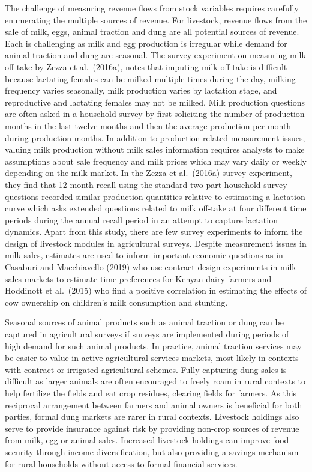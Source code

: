 \documentclass[
]{book}
\begin{document}
The challenge of measuring revenue flows from stock variables requires carefully enumerating the multiple sources of revenue. For livestock, revenue flows from the sale of milk, eggs, animal traction and dung are all potential sources of revenue. Each is challenging as milk and egg production is irregular while demand for animal traction and dung are seasonal. The survey experiment on measuring milk off-take by Zezza et al.~(2016a), notes that imputing milk off-take is difficult because lactating females can be milked multiple times during the day, milking frequency varies seasonally, milk production varies by lactation stage, and reproductive and lactating females may not be milked. Milk production questions are often asked in a household survey by first soliciting the number of production months in the last twelve months and then the average production per month during production months. In addition to production-related measurement issues, valuing milk production without milk sales information requires analysts to make assumptions about sale frequency and milk prices which may vary daily or weekly depending on the milk market. In the Zezza et al.~(2016a) survey experiment, they find that 12-month recall using the standard two-part household survey questions recorded similar production quantities relative to estimating a lactation curve which asks extended questions related to milk off-take at four different time periods during the annual recall period in an attempt to capture lactation dynamics. Apart from this study, there are few survey experiments to inform the design of livestock modules in agricultural surveys. Despite measurement issues in milk sales, estimates are used to inform important economic questions as in Casaburi and Macchiavello (2019) who use contract design experiments in milk sales markets to estimate time preferences for Kenyan dairy farmers and Hoddinott et al.~(2015) who find a positive correlation in estimating the effects of cow ownership on children's milk consumption and stunting.

Seasonal sources of animal products such as animal traction or dung can be captured in agricultural surveys if surveys are implemented during periods of high demand for such animal products. In practice, animal traction services may be easier to value in active agricultural services markets, most likely in contexts with contract or irrigated agricultural schemes. Fully capturing dung sales is difficult as larger animals are often encouraged to freely roam in rural contexts to help fertilize the fields and eat crop residues, clearing fields for farmers. As this reciprocal arrangement between farmers and animal owners is beneficial for both parties, formal dung markets are rarer in rural contexts. Livestock holdings also serve to provide insurance against risk by providing non-crop sources of revenue from milk, egg or animal sales. Increased livestock holdings can improve food security through income diversification, but also providing a savings mechanism for rural households without access to formal financial services.
\end{document}

